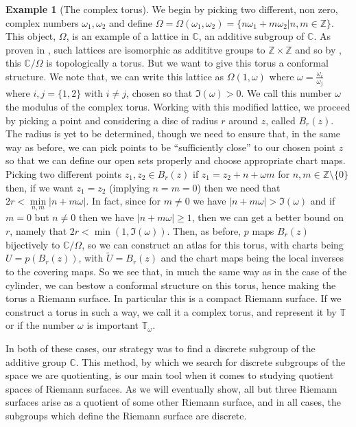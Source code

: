 \documentclass[11pt]{report}
\theoremstyle{definition}
\newtheorem{example}[thm]{Example}
\begin{document}
\begin{example}[The complex torus]
We begin by picking two different, non zero, complex numbers $\omega_1, \omega_2$ and define $\Omega = \Omega(\omega_1,\omega_2) = \{n\omega_1 + m\omega_2 \vert n,m \in \mathbb{Z} \}$. This object, $\Omega$, is an example of a lattice in $\mathbb{C}$, an additive subgroup of $\mathbb{C}$. As proven in \cite[p.58]{comfun}, such lattices are isomorphic as addititve groups to $\mathbb{Z} \times \mathbb{Z}$ and so by \cite[Example 1.43]{Hatchers}, this $\mathbb{C}/\Omega$ is topologically a torus. But we want to give this torus a conformal structure. We note that, we can write this lattice as $\Omega(1,\omega)$ where $\omega=\frac{\omega_i}{\omega_j}$ where $i,j = \{1, 2\}$ with $i \neq j$, chosen so that $\Im(\omega) > 0$. We call this number $\omega$ the modulus of the complex torus. Working with this modified lattice, we proceed by picking a point and considering a disc of radius $r$ around $z$, called $B_r(z)$. The radius is yet to be determined, though we need to ensure that, in the same way as before, we can pick points to be ``sufficiently close'' to our chosen point $z$ so that we can define our open sets properly and choose appropriate chart maps. Picking two different points $z_1,z_2 \in B_r(z)$ if $z_1 = z_2 + n + \omega m$ for $n,m \in \mathbb{Z}\setminus \{0\}$ then, if we want $z_1=z_2$ (implying $n=m=0$) then we need that $2r < \min\limits_{n,m}|n + m\omega|$. In fact, since for $m \neq 0$ we have $|n+m\omega| > \Im(\omega)$ and if $m=0$ but $n\neq 0$ then we have $|n + m\omega| \geq 1$, then we can get a better bound on $r$, namely that $2r < \min(1, \Im(\omega))$. Then, as before, $p$ maps $B_r(z)$ bijectively to $\mathbb{C}/\Omega$, so we can construct an atlas for this torus, with charts being $U = p(B_r(z))$, with $\tilde{U} = B_r(z)$ and the chart maps being the local inverses to the covering maps. So we see that, in much the same way as in the case of the cylinder, we can bestow a conformal structure on this torus, hence making the torus a Riemann surface. In particular this is a compact Riemann surface. If we construct a torus in such a way, we call it a complex torus, and represent it by $\mathbb{T}$ or if the number $\omega$ is important $\mathbb{T}_{\omega}$.
\end{example}

In both of these cases, our strategy was to find a discrete subgroup of the additive group $\mathbb{C}$. This method, by which we search for discrete subgroups of the space we are quotienting, is our main tool when it comes to studying quotient spaces of Riemann surfaces. As we will eventually show, all but three Riemann surfaces arise as a quotient of some other Riemann surface, and in all cases, the subgroups which define the Riemann surface are discrete. 
\end{document}
